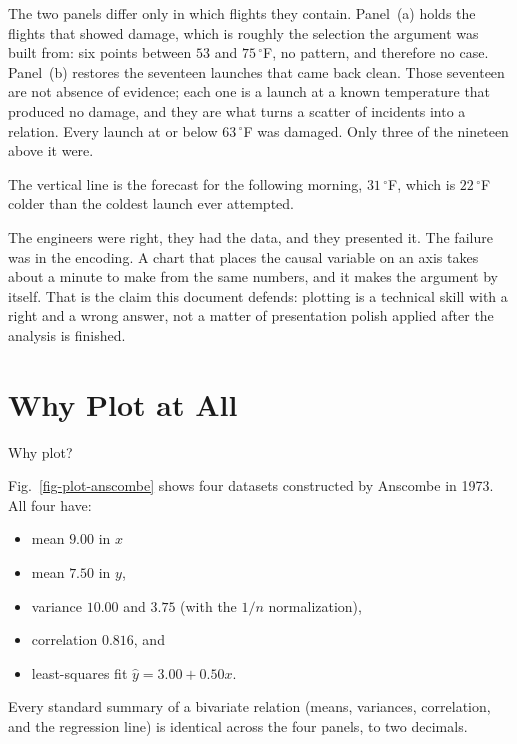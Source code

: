 The two panels differ only in which flights they contain. Panel~(a) holds the flights that showed damage, which is roughly the selection the argument was built from: six points between $53$ and $75\,^{\circ}$F, no pattern, and therefore no case. Panel~(b) restores the seventeen launches that came back clean. Those seventeen are not absence of evidence; each one is a launch at a known temperature that produced no damage, and they are what turns a scatter of incidents into a relation. Every launch at or below $63\,^{\circ}$F was damaged. Only three of the nineteen above it were.

The vertical line is the forecast for the following morning, $31\,^{\circ}$F, which is $22\,^{\circ}$F colder than the coldest launch ever attempted.

\begin{box_blue}
	The engineers were right, they had the data, and they presented it. The failure was in the encoding. A chart that places the causal variable on an axis takes about a minute to make from the same numbers, and it makes the argument by itself. That is the claim this document defends: plotting is a technical skill with a right and a wrong answer, not a matter of presentation polish applied after the analysis is finished.
\end{box_blue}

\section{Why Plot at All}\label{sec-app-plot-why}
\begin{goal}
Why plot?
\end{goal}

Fig.~\ref{fig-plot-anscombe} shows four datasets constructed by Anscombe in 1973. All four have:
\begin{itemize}
	\item  mean $9.00$ in $x$
	\item mean  $7.50$ in $y$, 
	\item variance $10.00$ and $3.75$ (with the $1/n$ normalization), 
	\item correlation $0.816$, and 
	\item least-squares fit $\hat{y} = 3.00 + 0.50x$.
\end{itemize} 
\begin{box_red}
Every standard summary of a bivariate relation (means, variances, correlation, and the regression line) is identical across the four panels, to two decimals.
\end{box_red}

